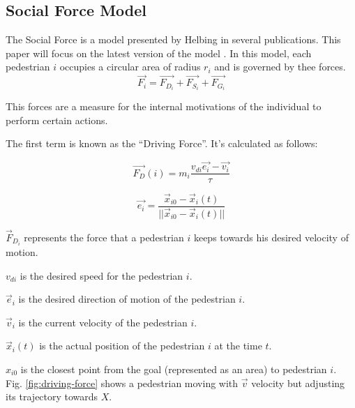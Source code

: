 \documentclass[english]{article}
\begin{document}
    \subsection{Social Force Model}
    
    The Social Force is a model presented by Helbing \cite{key-helb1995,key-helb2000}
    in several publications. This paper will focus on the latest version
    of the model \cite{key-helb2000}. In this model, each pedestrian
    $i$ occupies a circular area of radius $r_{i}$ and is governed by
    thee forces. 
    \[
    \vec{F_{i}}=\vec{F_{D_{i}}}+\vec{F_{S_{i}}}+\vec{F_{G_{i}}}
    \]
    
    
    This forces are a measure for the internal motivations of the individual
    to perform certain actions.
    
    The first term is known as the ``Driving Force''. It's calculated
    as follows:
    
    \begin{equation}
    \vec{F_{D}}(i)=m_{i}\frac{v_{di}\vec{e_{i}}-\vec{v_{i}}}{\tau}\label{eq:driving-force}
    \end{equation}
    
    
    \begin{equation}
    \vec{e_{i}}=\frac{\vec{x}_{i0}-\vec{x}_{i}(t)}{||\vec{x}_{i0}-\vec{x}_{i}(t)||}\label{eq:desired-direction}
    \end{equation}
    
    
    $\vec{F}_{D_{i}}$ represents the force that a pedestrian $i$ keeps
    towards his desired velocity of motion.
    
    $v_{di}$ is the desired speed for the pedestrian $i$.
    
    $\vec{e}{}_{i}$ is the desired direction of motion of the pedestrian
    $i$.
    
    $\vec{v}{}_{i}$ is the current velocity of the pedestrian $i$.
    
    $\vec{x}_{i}(t)$ is the actual position of the pedestrian $i$ at
    the time $t$.
    
    $x_{i0}$ is the closest point from the goal (represented as an
    area) to pedestrian $i$. \\
    
    Fig. \ref{fig:driving-force} shows a pedestrian moving with $\vec{v}$
    velocity but adjusting its trajectory towards \textbf{$X$}.
    
\end{document}
